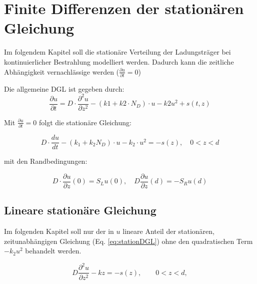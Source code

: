 \chapter{Finite Differenzen der stationären Gleichung}
Im folgendem Kapitel soll die stationäre Verteilung der Ladungsträger bei kontinuierlicher Bestrahlung modelliert werden. 
Dadurch kann die zeitliche Abhängigkeit vernachlässige werden ($\frac{\partial u}{\partial t}=0$)
 
Die allgemeine DGL ist gegeben durch:
\begin{equation}
	\frac{\partial u}{\partial t}= D\cdot\frac{\partial ^2 u }{\partial z^2}-(k1+k2\cdot N_D)\cdot u -k2u^2 +s(t,z)
\end{equation}

Mit $\frac{\partial u}{\partial t}=0$ folgt die stationäre Gleichung:

\begin{equation}\label{eq:stationDGL}
	D\cdot \frac{du}{dt} -\left( k_1 +k_2 N_D\right)\cdot u-k_2\cdot u^2=-s(z), \quad 0 <z<d
\end{equation}

mit den Randbedingungen:

\begin{equation}
	D\cdot \frac{\partial u}{\partial z}(0)=S_Lu(0),\quad D\frac{\partial u}{\partial z}(d)=-S_Ru(d)
\end{equation}
\section{Lineare stationäre Gleichung}
Im folgenden Kapitel soll nur der in $u$ lineare Anteil der stationären, zeitunabhängigen Gleichung (Eq. \ref{eq:stationDGL}) ohne den quadratischen Term $-k_2u^2$ behandelt werden\cite{Prof.Dr.AndreasZeiser.April2021}.

\begin{equation}
	D\frac{\partial ^2u}{\partial z^2}-kz=-s(z), \qquad 0<z<d,
\end{equation}



